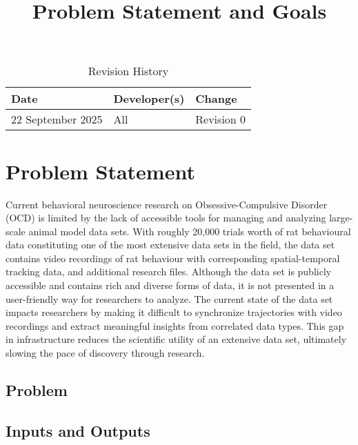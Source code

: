 \documentclass{article}
\title{Problem Statement and Goals\\\progname}
\author{\authname}
\date{}
\begin{document}
\maketitle

\begin{table}[hp]
\caption{Revision History} \label{TblRevisionHistory}
\begin{tabularx}{\textwidth}{llX}
\toprule
\textbf{Date} & \textbf{Developer(s)} & \textbf{Change}\\
\midrule
22 September 2025& All & Revision 0\\
\bottomrule
\end{tabularx}
\end{table}

\section{Problem Statement}

\par{Current behavioral neuroscience research on Obsessive-Compulsive Disorder (OCD) is limited by the lack of 
accessible tools for managing and analyzing large-scale animal model data sets. With roughly 20,000 trials worth 
of rat behavioural data constituting one of the most extensive data sets in the field, the data set contains 
video recordings of rat behaviour with corresponding spatial-temporal tracking data, and additional research files. 
Although the data set is publicly accessible and contains rich and diverse forms of data, it is not presented in a 
user-friendly way for researchers to analyze. The current state of the data set impacts researchers by making it 
difficult to synchronize trajectories with video recordings and extract meaningful insights from correlated data types. 
This gap in infrastructure reduces the scientific utility of an extensive data set, ultimately slowing the pace of 
discovery through research.}



\subsection{Problem}

\subsection{Inputs and Outputs}
\end{document}
